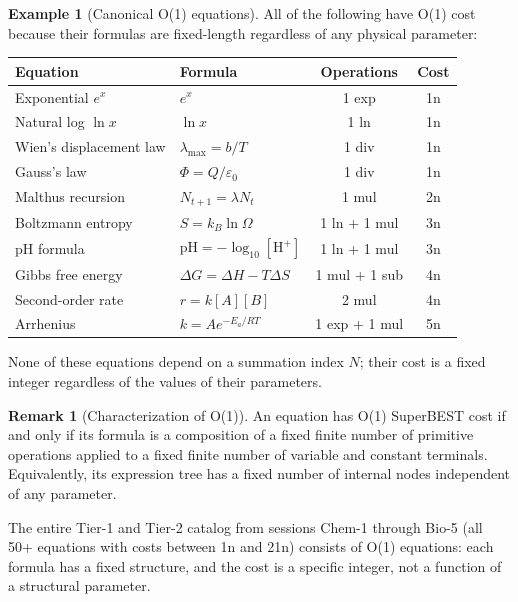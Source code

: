 \documentclass[12pt,a4paper]{article}
\theoremstyle{definition}
\newtheorem{remark}[theorem]{Remark}
\newtheorem{example}[theorem]{Example}
\begin{document}
\begin{example}[Canonical O(1) equations]
\label{ex:O1_examples}
All of the following have O(1) cost because their formulas are
fixed-length regardless of any physical parameter:

\begin{center}
\small
\begin{tabular}{@{}llcc@{}}
\toprule
\textbf{Equation} & \textbf{Formula} & \textbf{Operations} & \textbf{Cost} \\
\midrule
Exponential $e^x$         & $e^x$                    & 1 exp         & 1n \\
Natural log $\ln x$       & $\ln x$                  & 1 ln          & 1n \\
Wien's displacement law   & $\lambda_{\max} = b/T$   & 1 div         & 1n \\
Gauss's law               & $\Phi = Q/\varepsilon_0$ & 1 div         & 1n \\
Malthus recursion         & $N_{t+1} = \lambda N_t$  & 1 mul         & 2n \\
Boltzmann entropy         & $S = k_B \ln \Omega$     & 1 ln + 1 mul  & 3n \\
pH formula                & $\mathrm{pH} = -\log_{10}[\mathrm{H}^+]$ & 1 ln + 1 mul & 3n \\
Gibbs free energy         & $\Delta G = \Delta H - T\Delta S$ & 1 mul + 1 sub & 4n \\
Second-order rate         & $r = k[A][B]$            & 2 mul         & 4n \\
Arrhenius                 & $k = Ae^{-E_a/RT}$       & 1 exp + 1 mul & 5n \\
\bottomrule
\end{tabular}
\end{center}

\noindent
None of these equations depend on a summation index $N$; their cost is
a fixed integer regardless of the values of their parameters.
\end{example}

\begin{remark}[Characterization of O(1)]
\label{rem:O1_characterization}
An equation has O(1) SuperBEST cost if and only if its formula is a
composition of a fixed finite number of primitive operations applied to
a fixed finite number of variable and constant terminals.  Equivalently,
its expression tree has a fixed number of internal nodes independent of
any parameter.

The entire Tier-1 and Tier-2 catalog from sessions Chem-1 through
Bio-5 (all 50+ equations with costs between 1n and 21n) consists of
O(1) equations: each formula has a fixed structure, and the cost is
a specific integer, not a function of a structural parameter.
\end{remark}
\end{document}
